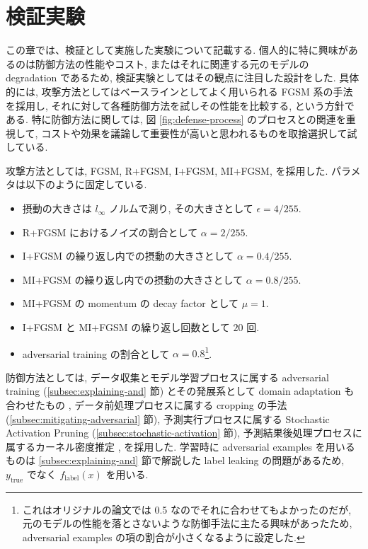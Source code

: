 \section{検証実験}
\label{sec:exp}
この章では、検証として実施した実験について記載する.
個人的に特に興味があるのは防御方法の性能やコスト, またはそれに関連する元のモデルの degradation であるため, 検証実験としてはその観点に注目した設計をした.
具体的には, 攻撃方法としてはベースラインとしてよく用いられる FGSM 系の手法を採用し, それに対して各種防御方法を試しその性能を比較する, という方針である.
特に防御方法に関しては, 図 \ref{fig:defense-process} のプロセスとの関連を重視して, コストや効果を議論して重要性が高いと思われるものを取捨選択して試している.

攻撃方法としては, FGSM, R+FGSM, I+FGSM, MI+FGSM, を採用した.
パラメタは以下のように固定している.
%
\begin{itemize}
  \item 摂動の大きさは $l_{\infty}$ ノルムで測り, その大きさとして $\epsilon = 4 / 255$.
  \item R+FGSM におけるノイズの割合として $\alpha = 2 / 255$.
  \item I+FGSM の繰り返し内での摂動の大きさとして $\alpha = 0.4 / 255$.
  \item MI+FGSM の繰り返し内での摂動の大きさとして $\alpha = 0.8 / 255$.
  \item MI+FGSM の momentum の decay factor として $\mu = 1$.
  \item I+FGSM と MI+FGSM の繰り返し回数として $20$ 回.
  \item adversarial training の割合として $\alpha = 0.8$\footnote{これはオリジナルの論文では 0.5 なのでそれに合わせてもよかったのだが, 元のモデルの性能を落とさないような防御手法に主たる興味があったため, adversarial examples の項の割合が小さくなるように設定した.}.
\end{itemize}
%

防御方法としては, データ収集とモデル学習プロセスに属する adversarial training (\ref{subsec:explaining-and} 節) とその発展系として domain adaptation も合わせたもの \cite{song2018improving}, データ前処理プロセスに属する cropping の手法 (\ref{subsec:mitigating-adversarial} 節), 予測実行プロセスに属する Stochastic Activation Pruning  (\ref{subsec:stochastic-activation} 節), 予測結果後処理プロセスに属するカーネル密度推定 \cite{feinman2017detecting}, を採用した.
学習時に adversarial examples を用いるものは \ref{subsec:explaining-and} 節で解説した label leaking の問題があるため, $y_{\text{true}}$ でなく $f_{\text{label}} (x)$ を用いる.

